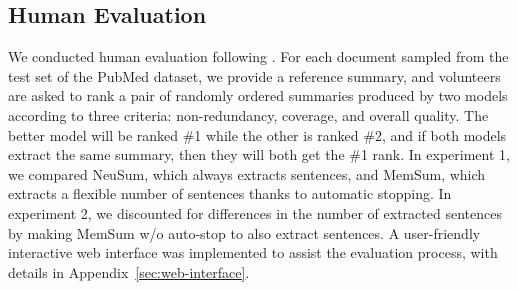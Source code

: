 \documentclass[11pt]{article}
\begin{document}
\subsection{Human Evaluation}
\label{sec:human-evaluation}
We conducted human evaluation following \citet{DBLP:journals/corr/abs-1804-07036,dong2018banditsum,luo2019reading}.
For each document sampled from the test set of the PubMed dataset, we provide a reference summary, and volunteers are asked to rank a pair of randomly ordered summaries produced by two models according to three criteria: non-redundancy, coverage, and overall quality. The better model will be ranked \#1 while the other is ranked \#2, and if both models extract the same summary, then they will both get the \#1 rank. In experiment 1, we compared NeuSum, which always extracts  sentences, and MemSum, which extracts a flexible number of sentences thanks to automatic stopping. In experiment 2, we discounted for differences in the number of extracted sentences by making MemSum w/o auto-stop to also extract  sentences.
A user-friendly interactive web interface was implemented to assist the evaluation process, with details in Appendix~\ref{sec:web-interface}.










\begin{table}
\centering
{}
\caption{ \label{tab:res_human_evaluation} The average ranking of NeuSum and MemSum is reported. The smaller the ranking, the better the model. Four volunteers participated in these experiments, and evaluated 67 and 63 pairs of summaries in Experiment 1 and 2, respectively. ``*'' indicates statistical significance (p<0.005) in a Wilcoxon signed-rank test \cite{Woolson2007}. }

\end{table}
\end{document}
